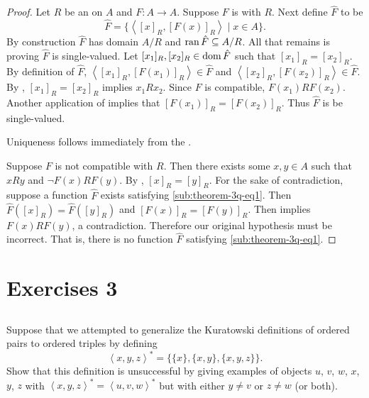 \documentclass{report}
\newcommand{\pair}[1]{\left< #1 \right>}
\begin{document}
\begin{proof}

  Let $R$ be an  on $A$ and
    $F \colon A \rightarrow A$.
  Suppose $F$ is  with $R$.
  Next define  $\hat{F}$ to be
    $$\hat{F} = \{\pair{[x]_R, [F(x)]_R} \mid x \in A\}.$$
  By construction $\hat{F}$ has domain $A / R$ and
    $\mathop{\text{ran}}{\hat{F}} \subseteq A / R$.
  All that remains is proving $\hat{F}$ is single-valued.
  Let $[x_1]_R, [x_2]_R \in \mathop{\text{dom}}{\hat{F}}$ such that $[x_1]_R = [x_2]_R$.
  By definition of $\hat{F}$, $\pair{[x_1]_R, [F(x_1)]_R} \in \hat{F}$
    and $\pair{[x_2]_R, [F(x_2)]_R} \in \hat{F}$.
  By , $[x_1]_R = [x_2]_R$ implies $x_1Rx_2$.
  Since $F$ is compatible, $F(x_1)RF(x_2)$.
  Another application of  implies that
    $[F(x_1)]_R = [F(x_2)]_R$.
  Thus $\hat{F}$ is be single-valued.

  Uniqueness follows immediately from the .

  \suitdivider

  Suppose $F$ is not compatible with $R$.
  Then there exists some $x, y \in A$ such that $xRy$ and $\neg F(x)RF(y)$.
  By , $[x]_R = [y]_R$.
  For the sake of contradiction, suppose a function $\hat{F}$ exists satisfying
    \eqref{sub:theorem-3q-eq1}.
  Then $\hat{F}([x]_R) = \hat{F}([y]_R)$ and $[F(x)]_R = [F(y)]_R$.
  Then  implies $F(x)RF(y)$, a contradiction.
  Therefore our original hypothesis must be incorrect.
  That is, there is no function $\hat{F}$ satisfying \eqref{sub:theorem-3q-eq1}.

\end{proof}

\section{Exercises 3}%

\subsection{}%

Suppose that we attempted to generalize the Kuratowski definitions of ordered
  pairs to ordered triples by defining
  $$\pair{x, y, z}^* = \{\{x\}, \{x, y\}, \{x, y, z\}\}.$$
Show that this definition is unsuccessful by giving examples of objects
  $u$, $v$, $w$, $x$, $y$, $z$ with
  $\pair{x, y, z}^* = \pair{u, v, w}^*$ but with either
  $y \neq v$ or $z \neq w$ (or both).
\end{document}
